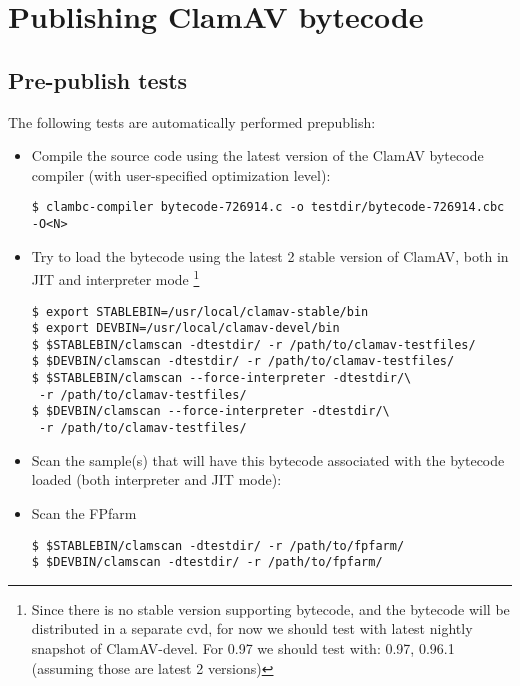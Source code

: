 \chapter{Publishing ClamAV bytecode}
\section{Pre-publish tests}

The following tests are automatically performed prepublish:
\begin{itemize}
 \item Compile the source code using the latest version of the ClamAV bytecode compiler (with user-specified optimization level):
\begin{verbatim}
$ clambc-compiler bytecode-726914.c -o testdir/bytecode-726914.cbc -O<N>
\end{verbatim}
 \item Try to load the bytecode using the latest 2 stable version of ClamAV, both in JIT and interpreter mode
\footnote{Since there is no stable version supporting bytecode, and the bytecode will be distributed in a separate cvd,
for now we should test with latest nightly snapshot of ClamAV-devel. 
For 0.97 we should test with: 0.97, 0.96.1 (assuming those are latest 2 versions)}
\begin{verbatim}
$ export STABLEBIN=/usr/local/clamav-stable/bin
$ export DEVBIN=/usr/local/clamav-devel/bin
$ $STABLEBIN/clamscan -dtestdir/ -r /path/to/clamav-testfiles/
$ $DEVBIN/clamscan -dtestdir/ -r /path/to/clamav-testfiles/
$ $STABLEBIN/clamscan --force-interpreter -dtestdir/\
 -r /path/to/clamav-testfiles/
$ $DEVBIN/clamscan --force-interpreter -dtestdir/\
 -r /path/to/clamav-testfiles/
\end{verbatim}
 \item Scan the sample(s) that will have this bytecode associated with the bytecode loaded (both interpreter and JIT mode):
 \item Scan the FPfarm
\begin{verbatim}
$ $STABLEBIN/clamscan -dtestdir/ -r /path/to/fpfarm/
$ $DEVBIN/clamscan -dtestdir/ -r /path/to/fpfarm/
\end{verbatim}
\end{itemize}

